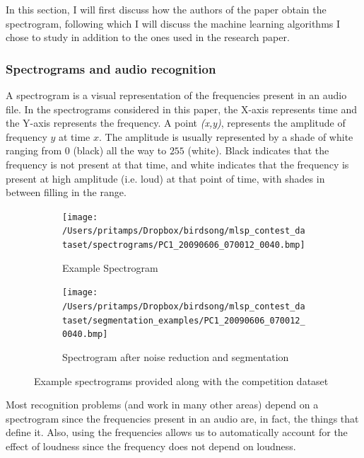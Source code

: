\documentclass[11pt]{article}
\begin{document}
In this section, I will first discuss how the authors of the paper obtain the spectrogram, following which I will discuss the machine learning algorithms I chose to study in addition to the ones used in the research paper.

\subsubsection{Spectrograms and audio recognition}

A spectrogram is a visual representation of the frequencies present in an audio file. In the spectrograms considered in this paper, the X-axis represents time and the Y-axis represents the frequency. A point \textit{(x,y)}, represents the amplitude of frequency $y$ at time $x$. The amplitude is usually represented by a shade of white ranging from $0$ (black) all the way to $255$ (white). Black indicates that the frequency is not present at that time, and white indicates that the frequency is present at high amplitude (i.e. loud) at that point of time, with shades in between filling in the range.

\begin{figure}
\begin{center}

\begin{subfigure}[b]{1.0\textwidth}
\texttt{[image: /Users/pritamps/Dropbox/birdsong/mlsp\_contest\_dataset/spectrograms/PC1\_20090606\_070012\_0040.bmp]}
\caption{Example Spectrogram}
\label{example_spectrogram}
\end{subfigure}

\begin{subfigure}[b]{1.0\textwidth}
\texttt{[image: /Users/pritamps/Dropbox/birdsong/mlsp\_contest\_dataset/segmentation\_examples/PC1\_20090606\_070012\_0040.bmp]}
\caption{Spectrogram after noise reduction and segmentation}
\label{segmented_spectrogram}
\end{subfigure}

\caption{Example spectrograms provided along with the competition dataset}
\end{center}
\end{figure}

Most recognition problems (and work in many other areas) depend on a spectrogram since the frequencies present in an audio are, in fact, the things that define it. Also, using the frequencies allows us to automatically account for the effect of loudness since the frequency does not depend on loudness.
\end{document}
